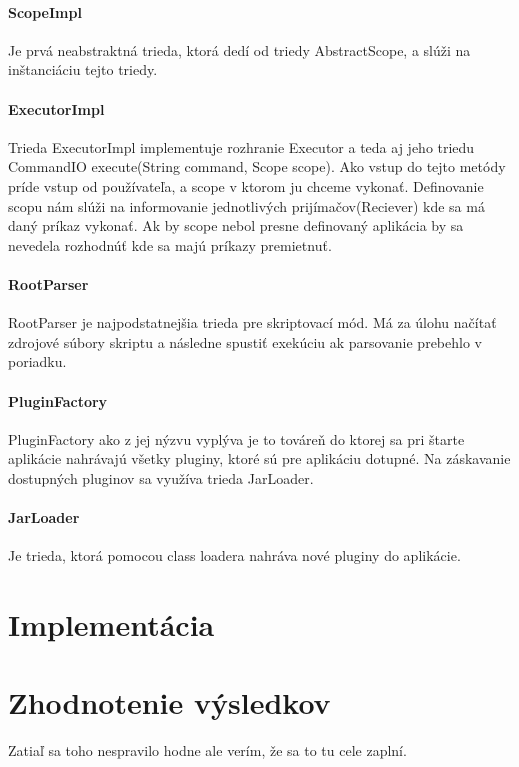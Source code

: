 \paragraph{ScopeImpl}
Je prvá neabstraktná trieda, ktorá dedí od triedy AbstractScope, a slúži na inštanciáciu tejto triedy. 
\paragraph{ExecutorImpl}
Trieda ExecutorImpl implementuje rozhranie Executor a teda aj jeho triedu CommandIO execute(String command, Scope scope). Ako vstup do tejto metódy príde vstup od používateľa, a scope v ktorom ju chceme vykonať. Definovanie scopu nám slúži na informovanie jednotlivých prijímačov(Reciever) kde sa má daný príkaz vykonať. Ak by scope nebol presne definovaný aplikácia by sa nevedela rozhodnúť kde sa majú príkazy premietnuť.
\paragraph{RootParser}
RootParser je najpodstatnejšia trieda pre skriptovací mód. Má za úlohu načítať zdrojové súbory skriptu a následne spustiť exekúciu ak parsovanie prebehlo v poriadku.
\paragraph{PluginFactory}
PluginFactory ako z jej nýzvu vyplýva je to továreň do ktorej sa pri štarte aplikácie nahrávajú všetky pluginy, ktoré sú pre aplikáciu dotupné. Na záskavanie dostupných pluginov sa využíva trieda JarLoader. 
\paragraph{JarLoader}
Je trieda, ktorá pomocou class loadera nahráva nové pluginy do aplikácie.
\section{Implementácia}
\section{Zhodnotenie výsledkov}
Zatiaľ sa toho nespravilo hodne ale verím, že sa to tu cele zaplní.
